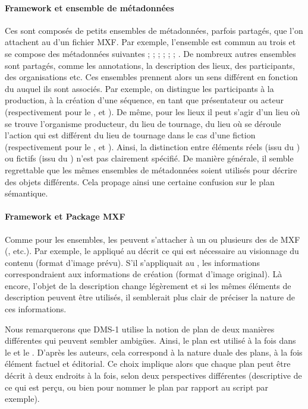 \paragraph{Framework et ensemble de métadonnées}
Ces  sont composés de petits ensembles de métadonnées, parfois partagés,  que l'on attachent au  d'un fichier MXF. 
Par exemple, l'ensemble  est commun au trois  et se compose des métadonnées suivantes ;  ;  ;  ;  ;  ; . 
De nombreux autres ensembles sont partagés, comme les annotations, la description des lieux, des participants, des organisations etc. 
Ces ensembles prennent alors un sens différent en fonction du  auquel ils sont associés. 
Par exemple, on distingue les participants à la production, à la création d'une séquence, en tant que présentateur ou acteur (respectivement pour le ,  et ). 
De même, pour les lieux il peut s'agir d'un lieu où se trouve l'organisme producteur, du lieu de tournage, du lieu où se déroule l'action qui est différent du lieu de tournage dans le cas d'une fiction (respectivement pour le ,  et ). 
Ainsi, la distinction entre éléments réels (issu du ) ou fictifs (issu du ) n'est pas clairement spécifié. 
De manière générale, il semble regrettable que les mêmes ensembles de métadonnées soient utilisés pour décrire des objets différents.
Cela propage ainsi une certaine confusion sur le plan sémantique. 

\paragraph{Framework et Package MXF}
Comme pour les ensembles, les  peuvent s'attacher à un ou plusieurs des  de MXF (,  etc.). 
Par exemple, le  appliqué au  décrit ce qui est nécessaire au visionnage du contenu (format d'image prévu).
S'il s'appliquait au , les informations correspondraient aux informations de création (format d'image original).
Là encore, l'objet de la description change légèrement et si les mêmes éléments de description peuvent être utilisés, il semblerait plus clair de préciser la nature de ces informations. 

Nous remarquerons que DMS-1 utilise la notion de plan de deux manières différentes qui peuvent sembler ambigües. 
Ainsi, le plan est utilisé à la fois dans le  et le . 
D'après les auteurs, cela correspond à la nature duale des plans, à la fois élément factuel et éditorial. 
Ce choix implique alors que chaque plan peut être décrit à deux endroits à la fois, selon deux perspectives différentes (descriptive de ce qui est perçu, ou bien pour nommer le plan par rapport au script par exemple).

